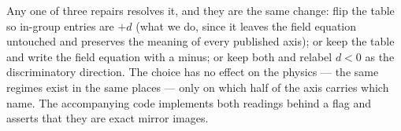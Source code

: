 Any one of three repairs resolves it, and they are the same change: flip the
table so in-group entries are $+d$ (what we do, since it leaves the field
equation untouched and preserves the meaning of every published axis); or keep
the table and write the field equation with a minus; or keep both and relabel
$d<0$ as the discriminatory direction. The choice has no effect on the physics
--- the same regimes exist in the same places --- only on which half of the axis
carries which name. The accompanying code implements both readings behind a flag
and asserts that they are exact mirror images.
